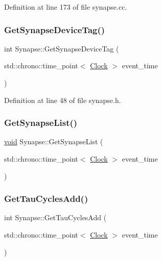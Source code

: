 Definition at line 173 of file synapse.\+cc.

\mbox{\label{class_synapse_a4fe6b49e46ebda6f34593d3df54d5593}} 
\subsubsection{\texorpdfstring{Get\+Synapse\+Device\+Tag()}{GetSynapseDeviceTag()}}
{\footnotesize\ttfamily int Synapse\+::\+Get\+Synapse\+Device\+Tag (\begin{DoxyParamCaption}\item[{std\+::chrono\+::time\+\_\+point$<$ \mbox{\hyperlink{universe_8h_a0ef8d951d1ca5ab3cfaf7ab4c7a6fd80}{Clock}} $>$}]{event\+\_\+time }\end{DoxyParamCaption})\hspace{0.3cm}{\ttfamily [inline]}}



Definition at line 48 of file synapse.\+h.

\mbox{\label{class_synapse_a63f214e8ccef1f6625d5fecd36104efe}} 
\subsubsection{\texorpdfstring{Get\+Synapse\+List()}{GetSynapseList()}}
{\footnotesize\ttfamily \mbox{\hyperlink{glad_8h_a950fc91edb4504f62f1c577bf4727c29}{void}} Synapse\+::\+Get\+Synapse\+List (\begin{DoxyParamCaption}\item[{std\+::chrono\+::time\+\_\+point$<$ \mbox{\hyperlink{universe_8h_a0ef8d951d1ca5ab3cfaf7ab4c7a6fd80}{Clock}} $>$}]{event\+\_\+time }\end{DoxyParamCaption})}

\mbox{\label{class_synapse_aeaf2f46a927a4aa7ad982e7da9d630d6}} 
\subsubsection{\texorpdfstring{Get\+Tau\+Cycles\+Add()}{GetTauCyclesAdd()}}
{\footnotesize\ttfamily int Synapse\+::\+Get\+Tau\+Cycles\+Add (\begin{DoxyParamCaption}\item[{std\+::chrono\+::time\+\_\+point$<$ \mbox{\hyperlink{universe_8h_a0ef8d951d1ca5ab3cfaf7ab4c7a6fd80}{Clock}} $>$}]{event\+\_\+time }\end{DoxyParamCaption})\hspace{0.3cm}{\ttfamily [inline]}}



